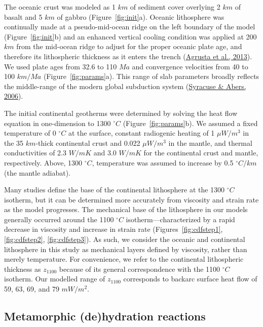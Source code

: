 \documentclass[draft,linenumbers]{agujournal2018}
\begin{document}
The oceanic crust was modeled as 1 \(km\) of sediment cover overlying 2
\(km\) of basalt and 5 \(km\) of gabbro (Figure~\ref{fig:init}a).
Oceanic lithosphere was continually made at a pseudo-mid-ocean ridge on
the left boundary of the model (Figure~\ref{fig:init}b) and an enhanced
vertical cooling condition was applied at 200 \(km\) from the mid-ocean
ridge to adjust for the proper oceanic plate age, and therefore its
lithospheric thickness as it enters the trench
(\protect\hyperlink{ref-Agrusta2013}{Agrusta et al., 2013}). We used
plate ages from 32.6 to 110 \(Ma\) and convergence velocities from 40 to
100 \(km/Ma\) (Figure~\ref{fig:params}a). This range of slab parameters
broadly reflects the middle-range of the modern global subduction system
(\protect\hyperlink{ref-Syracuse2006}{Syracuse \& Abers, 2006}).

The initial continental geotherms were determined by solving the heat
flow equation in one-dimension to 1300 \(^{\circ}C\)
(Figure~\ref{fig:params}b). We assumed a fixed temperature of 0
\(^{\circ}C\) at the surface, constant radiogenic heating of 1
\(\mu W/m^{3}\) in the 35 \(km\)-thick continental crust and 0.022
\(\mu W/m^{3}\) in the mantle, and thermal conductivities of 2.3
\(W/mK\) and 3.0 \(W/mK\) for the continental crust and mantle,
respectively. Above, 1300 \(^{\circ}C\), temperature was assumed to
increase by 0.5 \(^{\circ}C/km\) (the mantle adiabat).

Many studies define the base of the continental lithosphere at the 1300
\(^{\circ}C\) isotherm, but it can be determined more accurately from
viscosity and strain rate as the model progresses. The mechanical base
of the lithosphere in our models generally occurred around the 1100
\(^{\circ}C\) isotherm---characterized by a rapid decrease in viscosity
and increase in strain rate
(Figures~\ref{fig:cdfstep1}, \ref{fig:cdfstep2}, \ref{fig:cdfstep3}). As
such, we consider the oceanic and continental lithosphere in this study
as mechanical layers defined by viscosity, rather than merely
temperature. For convenience, we refer to the continental lithospheric
thickness as \(z_{1100}\) because of its general correspondence with the
1100 \(^{\circ}C\) isotherm. Our modelled range of \(z_{1100}\)
corresponds to backarc surface heat flow of 59, 63, 69, and 79
\(mW/m^{2}\).

\hypertarget{metamorphic-dehydration-reactions}{%
\subsection{Metamorphic (de)hydration
reactions}\label{metamorphic-dehydration-reactions}}
\end{document}
